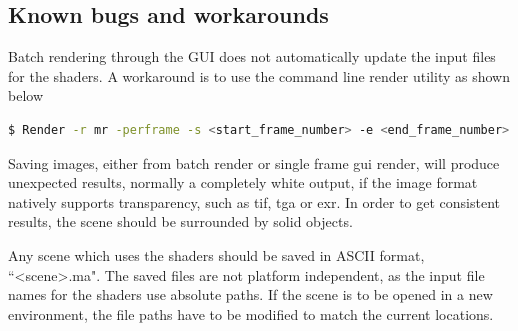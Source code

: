 \subsection{Known bugs and workarounds}
\label{sec:known_bugs_and_workarounds}

Batch rendering through the \Maya GUI does not automatically update the input files for the shaders.
A workaround is to use the command line render utility as shown below

\begin{lstlisting}[language=bash,caption={Batch render command}]
$ Render -r mr -perframe -s <start_frame_number> -e <end_frame_number> <path_to_scene_file>
\end{lstlisting}

Saving images, either from batch render or single frame gui render, will produce unexpected results, normally a completely white output, if the image format natively supports transparency, such as tif, tga or exr.
In order to get consistent results, the scene should be surrounded by solid objects.

Any \Maya scene which uses the shaders should be saved in \Maya ASCII format, ``{\textless}scene{\textgreater}.ma".
The saved files are not platform independent, as the input file names for the shaders use absolute paths.
If the scene is to be opened in a new environment, the file paths have to be modified to match the current locations.